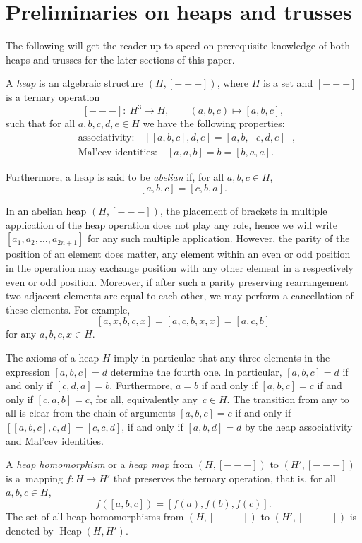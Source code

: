\documentclass[10pt,a4paper]{amsart}
\numberwithin{equation}{section}
\newcommand{\heap}{\operatorname{Heap}}
\begin{document}
\section{Preliminaries on heaps and trusses}
The following will get the reader up to speed on prerequisite knowledge of both heaps \cite{5, Brz:par, 2, 6} and trusses \cite{3, Brz:par} for the later sections of this paper.
\begin{Definition}\label{heap}
A \textit{heap} is an algebraic structure $(H, [---])$, where $H$ is a set and $[---]$ is a ternary operation
\[[---]\colon \ H^{3} \rightarrow H, \qquad (a,b,c) \mapsto [a,b,c],\]
such that for all $a,b,c,d,e \in H$ we have the following properties:
\begin{align*}
& \text{associativity:} \quad [[a,b,c],d,e] = [a,b,[c,d,e]],\\
& \text{Mal'cev identities:} \quad [a,a,b] = b = [b,a,a].
\end{align*}

Furthermore, a heap is said to be \textit{abelian} if, for all $a,b,c \in H$,
\[[a,b,c]=[c,b,a].\]
\end{Definition}
\begin{Remark}\label{rem.rules}
In an abelian heap $(H,[---])$, the placement of brackets in multiple application of the heap operation does not play any role, hence we will write $[a_1,a_2,\dots ,a_{2n+1}]$ for any such multiple application. However, the parity of the position of an element does matter, any element within an even or odd position in the operation may exchange position with any other element in a respectively even or odd position. Moreover, if after such a parity preserving rearrangement two adjacent elements are equal to each other, we may perform a cancellation of these elements. For example,
\[[a,x,b,c,x] = [a,c,b,x,x] = [a,c,b] \]
for any $a,b,c,x \in H$.
\end{Remark}
\begin{Remark}\label{rem.equal}
The axioms of a heap $H$ imply in particular that any three elements in the expression $[a,b,c]=d$ determine the fourth one. In particular, $[a,b,c]=d$ if and only if ${[c,d,a]=b}$. Furthermore, $a=b$ if and only if $[a,b,c]=c$ if and only if $[c,a,b]= c$, for all, equivalently any~$c\in H$. The transition from any to all is clear from the chain of arguments $[a,b,c]=c$ if and only if $[[a,b,c],c,d]=[c,c,d]$, if and only if $[a,b,d]=d$ by the heap associativity and Mal'cev identities.
\end{Remark}
\begin{Definition}
A \textit{heap homomorphism} or a \textit{heap map} from $(H,[---])$ to $(H',[---])$ is a~mapping $f\colon H \rightarrow H'$ that preserves the ternary operation, that is, for all $a,b,c \in H$, \[f([a,b,c])=[f(a),f(b),f(c)].\]
The set of all heap homomorphisms from $(H,[---])$ to $(H',[---])$ is denoted by $\heap(H,H')$.
\end{Definition}
\end{document}
